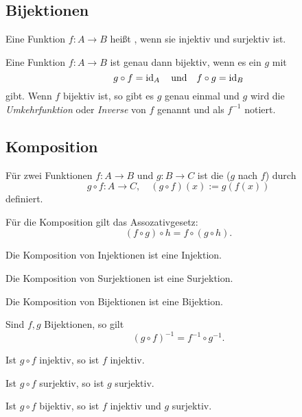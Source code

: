 \subsection{Bijektionen}
\begin{Definition}
Eine Funktion $f\colon A\to B$ heißt ,
wenn sie injektiv und surjektiv ist.

Eine Funktion $f\colon A\to B$ ist genau dann bijektiv, wenn es
ein $g$ mit
\begin{equation}
g\circ f = \operatorname{id}_A\quad\text{und}\quad f\circ g = \operatorname{id}_B
\end{equation}
gibt. Wenn $f$ bijektiv ist, so gibt es $g$ genau einmal und
$g$ wird die \emph{Umkehrfunktion}
oder \emph{Inverse}
von $f$ genannt und als $f^{-1}$ notiert.
\end{Definition}

\subsection{Komposition}
\begin{Definition} Für zwei Funktionen $f\colon A\to B$
und $g\colon B\to C$ ist die 
($g$ nach $f$)
durch
\begin{equation}
g\circ f\colon A\to C,\quad (g\circ f)(x) := g(f(x))
\end{equation}
definiert.
\end{Definition}
Für die Komposition gilt das Assozativgesetz:
\begin{equation}
(f\circ g)\circ h = f\circ(g\circ h).
\end{equation}

Die Komposition von Injektionen ist eine Injektion.

Die Komposition von Surjektionen ist eine Surjektion.

Die Komposition von Bijektionen ist eine Bijektion.

Sind $f,g$ Bijektionen, so gilt
\begin{equation}
(g\circ f)^{-1} = f^{-1}\circ g^{-1}.
\end{equation}

Ist $g\circ f$ injektiv, so ist $f$ injektiv.

Ist $g\circ f$ surjektiv, so ist $g$ surjektiv.

Ist $g\circ f$ bijektiv, so ist $f$ injektiv und $g$ surjektiv.

